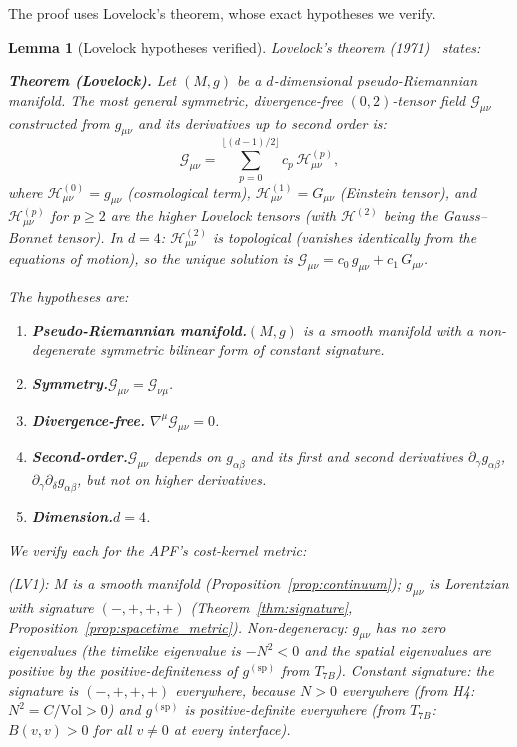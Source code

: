 \documentclass[11pt,a4paper]{article}
\newtheorem{lemma}[theorem]{Lemma}
\theoremstyle{definition}
\begin{document}
\noindent The proof uses Lovelock's theorem, whose exact hypotheses we
verify.

\begin{lemma}[Lovelock hypotheses verified]\label{lem:lovelock_hyp}
Lovelock's theorem (1971)~\cite{Lovelock1971} states:

\smallskip\noindent\textbf{Theorem (Lovelock).}\quad
\textit{Let $(M, g)$ be a $d$-dimensional pseudo-Riemannian manifold.
The most general symmetric, divergence-free $(0,2)$-tensor field
$\mathcal{G}_{\mu\nu}$ constructed from $g_{\mu\nu}$ and its
derivatives up to second order is:
\[
  \mathcal{G}_{\mu\nu} = \sum_{p=0}^{\lfloor(d-1)/2\rfloor}
  c_p\, \mathcal{H}^{(p)}_{\mu\nu},
\]
where $\mathcal{H}^{(0)}_{\mu\nu} = g_{\mu\nu}$ (cosmological term),
$\mathcal{H}^{(1)}_{\mu\nu} = G_{\mu\nu}$ (Einstein tensor), and
$\mathcal{H}^{(p)}_{\mu\nu}$ for $p \ge 2$ are the higher Lovelock
tensors (with $\mathcal{H}^{(2)}$ being the Gauss--Bonnet tensor).
In $d = 4$: $\mathcal{H}^{(2)}_{\mu\nu}$ is topological (vanishes
identically from the equations of motion), so the unique solution is
$\mathcal{G}_{\mu\nu} = c_0\, g_{\mu\nu} + c_1\, G_{\mu\nu}$.}

\smallskip\noindent The hypotheses are:
\begin{enumerate}[label=(LV\arabic*),nosep]
  \item \textbf{Pseudo-Riemannian manifold.}\quad $(M, g)$ is a smooth
  manifold with a non-degenerate symmetric bilinear form of constant
  signature.
  \item \textbf{Symmetry.}\quad $\mathcal{G}_{\mu\nu} = \mathcal{G}_{\nu\mu}$.
  \item \textbf{Divergence-free.}\quad
  $\nabla^\mu \mathcal{G}_{\mu\nu} = 0$.
  \item \textbf{Second-order.}\quad $\mathcal{G}_{\mu\nu}$ depends on
  $g_{\alpha\beta}$ and its first and second derivatives
  $\partial_\gamma g_{\alpha\beta}$,
  $\partial_\gamma \partial_\delta g_{\alpha\beta}$, but not on higher
  derivatives.
  \item \textbf{Dimension.}\quad $d = 4$.
\end{enumerate}
We verify each for the APF's cost-kernel metric:

(LV1): $M$ is a smooth manifold
(Proposition~\ref{prop:continuum}); $g_{\mu\nu}$ is Lorentzian with
signature $(-,+,+,+)$ (Theorem~\ref{thm:signature},
Proposition~\ref{prop:spacetime_metric}).  Non-degeneracy: $g_{\mu\nu}$
has no zero eigenvalues (the timelike eigenvalue is $-N^2 < 0$ and the
spatial eigenvalues are positive by the positive-definiteness of
$g^{(\mathrm{sp})}$ from $T_{7B}$).  Constant signature: the signature
is $(-,+,+,+)$ everywhere, because $N > 0$ everywhere (from H4:
$N^2 = C/\mathrm{Vol} > 0$) and $g^{(\mathrm{sp})}$ is
positive-definite everywhere (from $T_{7B}$: $B(v,v) > 0$ for all
$v \ne 0$ at every interface).


\end{lemma}
\end{document}
